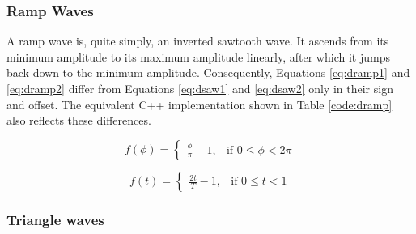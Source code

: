 \begin{table}
\end{table}

\subsubsection{Ramp Waves}

A ramp wave is, quite simply, an inverted sawtooth wave. It ascends from its minimum amplitude to its maximum amplitude linearly, after which it jumps back down to the minimum amplitude. Consequently, Equations \ref{eq:dramp1} and \ref{eq:dramp2} differ from Equations \ref{eq:dsaw1} and \ref{eq:dsaw2} only in their sign and offset. The equivalent C++ implementation shown in Table \ref{code:dramp} also reflects these differences.

\begin{multicols}{2}

  \begin{equation}
    f(\phi) =
    \begin{cases}
      \frac{\phi}{\pi} - 1,& \text{if } 0 \leq \phi < 2 \pi
    \end{cases}
    \label{eq:dramp1}
  \end{equation}

  \begin{equation}
    f(t) =
    \begin{cases}
      \frac{2t}{T} - 1,& \text{if } 0 \leq t < 1
    \end{cases}
    \label{eq:dramp2}
  \end{equation}

\end{multicols}

\begin{table}
\end{table}

\pagebreak

\subsubsection{Triangle waves}

